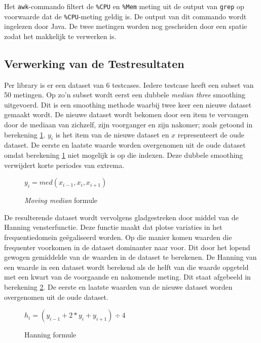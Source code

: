Het \verb+awk+-commando filtert de \verb+%CPU+ en \verb+%Mem+ meting uit de output van \verb+grep+ op voorwaarde dat de \verb+%CPU+-meting geldig is. De output van dit commando wordt ingelezen door Java. De twee metingen worden nog gescheiden door een spatie zodat het makkelijk te verwerken is.

\subsection{Verwerking van de Testresultaten}
\label{sec:methodologie:verwerking}

Per library is er een dataset van 6 testcases. Iedere testcase heeft een subset van 50 metingen. Op zo'n subset wordt eerst een dubbele \textit{median three} smoothing uitgevoerd. \autocite{mediansmoothing} Dit is een smoothing methode waarbij twee keer een nieuwe dataset gemaakt wordt. De nieuwe dataset wordt bekomen door een item te vervangen door de mediaan van zichzelf, zijn voorganger en zijn nakomer; zoals getoond in berekening \ref{math:mediansmooth}. $y_{i}$ is het item van de nieuwe dataset en $x$ representeert de oude dataset. De eerste en laatste waarde worden overgenomen uit de oude dataset omdat berekening \ref{math:mediansmooth} niet mogelijk is op die indexen. Deze dubbele smoothing verwijdert korte periodes van extrema.

\begin{figure}
\centering
$y_{i} = med(x_{i-1}, x_{i}, x_{i+1})$
\caption{\textit{Moving median} formule}
\label{math:mediansmooth}
\end{figure}

De resulterende dataset wordt vervolgens gladgestreken door middel van de Hanning vensterfunctie. Deze functie maakt dat plotse variaties in het frequentiedomein geëgaliseerd worden. Op die manier komen waarden die frequenter voorkomen in de dataset dominanter naar voor. Dit door het lopend gewogen gemiddelde van de waarden in de dataset te berekenen. De Hanning van een waarde in een dataset wordt berekend als de helft van die waarde opgeteld met een kwart van de voorgaande en nakomende meting. Dit staat afgebeeld in berekening \ref{math:hanningformule}. De eerste en laatste waarden van de nieuwe dataset worden overgenomen uit de oude dataset. \autocite{hanning}

\begin{figure}
\centering
$h_{i} = (y_{i-1} + 2 \ast y_{i} + y_{i+1}) \div 4$
\caption{Hanning formule}
\label{math:hanningformule}
\end{figure}

